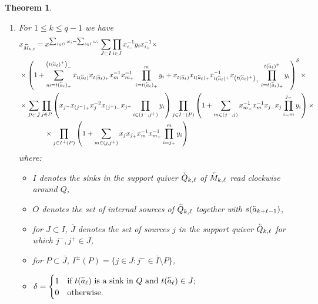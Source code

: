 \documentclass[12pt]{amsart}
\renewcommand{\vec}[1]{\accentset{\shortrightarrow}{#1}}
\newcommand{\cev}[1]{\accentset{\shortleftarrow}{#1}}
\newtheorem{theorem}{Theorem}[section]
\numberwithin{equation}{section}
\begin{document}
\begin{theorem}
\begin{enumerate}
\begin{itemize}
        \item $\delta=\begin{cases}1 & \text{if $t(\vec{a}_\ell)$ is a sink in $Q$ and $t(\vec{a}_\ell)\in J$;}\\0 & \text{otherwise.}\end{cases}$
      \end{itemize}
      \item For $1\le k\le q-1$ we have
      \begin{align}
        &x_{\cev{M}_{k,\ell}}=x^{\sum_{i\in O}\omega_i-\sum_{i\in I}\omega_i}\sum_{J\subset I}\prod_{i\in J}x_{i_-}^{-1}y_ix_{i_+}^{-1}\times\\
        \nonumber&\times\left(1+\sum_{m=t(\cev{a}_\ell)_+}^{\left(t(\cev{a}_\ell)^+\right)_-}x_{t(\cev{a}_\ell)}x_{t(\cev{a}_\ell)_+}x_m^{-1}x_{m_+}^{-1}\prod_{i=t(\cev{a}_\ell)_+}^m y_i+x_{t(\cev{a}_\ell)}x_{t(\cev{a}_\ell)_+}x_{t(\cev{a}_\ell)^+}^{-1}x_{\left(t(\cev{a}_\ell)^+\right)_+}\prod_{i=t(\cev{a}_\ell)_+}^{t(\cev{a}_\ell)^+}y_i\right)^\delta\times\\
        \nonumber&\times\sum_{P\subset\bar{J}}\prod_{j\in P}\left(x_{j^-}x_{(j^-)_+}x_j^{-2}x_{(j^+)_-}x_{j^+}\prod_{i\in(j^-,j^+)}y_i\right)\prod_{j\in I^-(P)}\left(1+\sum_{m\in(j^-,j)}x_{m_-}^{-1}x_m^{-1}x_{j_-}x_j\prod_{i=m}^{j_-}y_i\right)\times\\
        \nonumber&\hspace{0.5in}\times\prod_{j\in I^+(P)}\left(1+\sum_{m\in(j,j^+)}x_jx_{j_+}x_m^{-1}x_{m_+}^{-1}\prod_{i=j_+}^m y_i\right)
      \end{align}
      where:
      \begin{itemize}
        \item $I$ denotes the sinks in the support quiver $\cev{Q}_{k,\ell}$ of $\cev{M}_{k,\ell}$ read clockwise around $Q$,
        \item $O$ denotes the set of internal sources of $\cev{Q}_{k,\ell}$ together with $s(\cev{a}_{k+\ell-1})$,
        \item for $J\subset I$, $\bar{J}$ denotes the set of sources $j$ in the support quiver $\cev{Q}_{k,\ell}$ for which $j^-,j^+\in J$,
        \item for $P\subset\bar{J}$, $I^\pm(P)=\{j\in J:j^-\in\bar{I}\setminus P\}$,
        \item $\delta=\begin{cases}1 & \text{if $t(\cev{a}_\ell)$ is a sink in $Q$ and $t(\cev{a}_\ell)\in J$;}\\0 & \text{otherwise.}\end{cases}$
      \end{itemize}
    \end{enumerate}
  \end{theorem}
\end{document}
